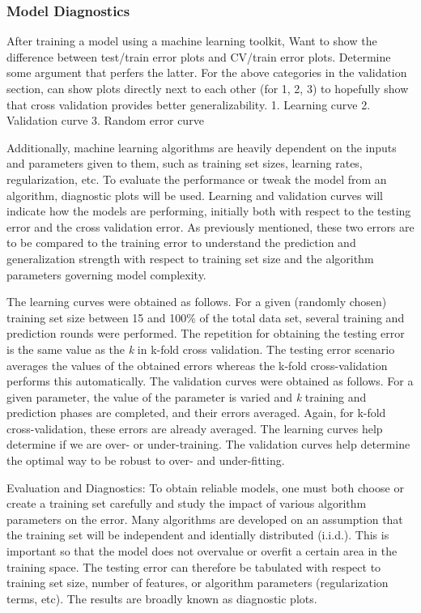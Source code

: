 \subsubsection{Model Diagnostics}
\label{sec:algeval}

After training a model using a machine learning toolkit, 
Want to show the difference between test/train error plots and CV/train error
plots.  Determine some argument that perfers the latter. For the above
categories in the validation section, can show plots directly next to each
other (for 1, 2, 3) to hopefully show that cross validation provides better
generalizability.
1. Learning curve
2. Validation curve
3. Random error curve

Additionally, machine learning algorithms are heavily dependent on the inputs
and parameters given to them, such as training set sizes, learning rates,
regularization, etc. To evaluate the performance or tweak the model from an
algorithm, diagnostic plots will be used. Learning and validation curves will
indicate how the models are performing, initially both with respect to the
testing error and the cross validation error. As previously mentioned, these
two errors are to be compared to the training error to understand the
prediction and generalization strength with respect to training set size and
the algorithm parameters governing model complexity. 

The learning curves were obtained as follows. For a given (randomly chosen)
training set size between 15 and 100\% of the total data set, several training
and prediction rounds were performed. The repetition for obtaining the testing
error is the same value as the \textit{k} in k-fold cross validation. The
testing error scenario averages the values of the obtained errors whereas the
k-fold cross-validation performs this automatically.  The validation curves
were obtained as follows. For a given parameter, the value of the parameter is
varied and \textit{k} training and prediction phases are completed, and their
errors averaged. Again, for k-fold cross-validation, these errors are already
averaged. The learning curves help determine if we are over- or under-training.
The validation curves help determine the optimal way to be robust to over- and
under-fitting. 

Evaluation and Diagnostics: To obtain reliable models, one must both choose or create a training set
carefully and study the impact of various algorithm parameters on the error.
Many algorithms are developed on an assumption that the training set will be
independent and identially distributed (i.i.d.). This is important so that the
model does not overvalue or overfit a certain area in the training space. The
testing error can therefore be tabulated with respect to training set size,
number of features, or algorithm parameters (regularization terms, etc). The
results are broadly known as diagnostic plots. 

